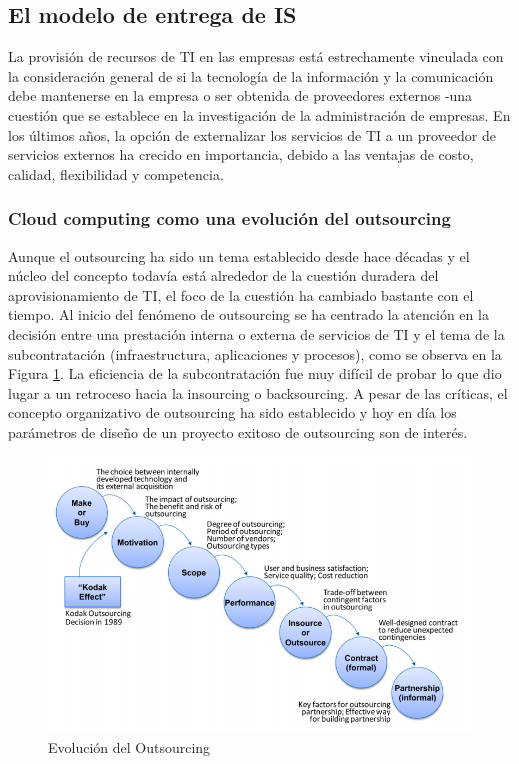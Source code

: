 \documentclass[a4paper, 12pt]{report}
\begin{document}
\subsection{El modelo de entrega de IS}
\begin{justify}
La provisión de recursos de TI en las empresas está estrechamente vinculada con la consideración general de si la tecnología de la información y la comunicación debe mantenerse en la empresa o ser obtenida de proveedores externos -una cuestión que se establece en la investigación de la administración de empresas. En los últimos años, la opción de externalizar los servicios de TI a un proveedor de servicios externos ha crecido en importancia, debido a las ventajas de costo, calidad, flexibilidad y competencia. \cite{Markus}
\end{justify}
\subsubsection{Cloud computing como una evolución del outsourcing}
\begin{justify}
Aunque el outsourcing ha sido un tema establecido desde hace décadas y el núcleo del concepto todavía está alrededor de la cuestión duradera del aprovisionamiento de TI, el foco de la cuestión ha cambiado bastante con el tiempo. Al inicio del fenómeno de outsourcing se ha centrado la atención en la decisión entre una prestación interna o externa de servicios de TI y el tema de la subcontratación (infraestructura, aplicaciones y procesos), como se observa en la Figura \ref{fig:provisionTI}. La eficiencia de la subcontratación fue muy difícil de probar lo que dio lugar a un retroceso hacia la insourcing o backsourcing.
A pesar de las críticas, el concepto organizativo de outsourcing ha sido establecido y hoy en día los parámetros de diseño de un proyecto exitoso de outsourcing son de interés.
\end{justify}
\begin{figure}[ht]
	\begin{center}
		\includegraphics[width=1\textwidth]{provisionTI}
		\caption{Evolución del Outsourcing}
		\label{fig:provisionTI}
	\end{center}
\end{figure}
\end{document}
